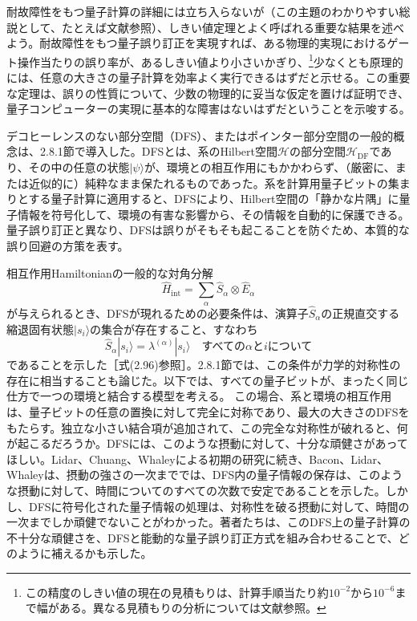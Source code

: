 \hypertarget{srcpage:321}{}\label{srcpage:321}
耐故障性をもつ量子計算の詳細には立ち入らないが（この主題のわかりやすい総説として、たとえば文献\cite{ref056,ref367}参照）、しきい値定理とよく呼ばれる重要な結果\cite{ref360,ref368,ref369,ref370,ref371}を述べよう。耐故障性をもつ量子誤り訂正を実現すれば、ある物理的実現におけるゲート操作当たりの誤り率が、あるしきい値より小さいかぎり、\footnote{この精度のしきい値の現在の見積もりは、計算手順当たり約$10^{-2}$から$10^{-6}$まで幅がある。異なる見積もりの分析については文献\cite{ref372}参照。}少なくとも原理的には、任意の大きさの量子計算を効率よく実行できるはずだと示せる。この重要な定理は、誤りの性質について、少数の物理的に妥当な仮定を置けば証明でき、量子コンピューターの実現に基本的な障害はないはずだということを示唆する。

デコヒーレンスのない部分空間（DFS）\cite{ref089,ref090,ref091,ref092,ref093,ref094,ref095,ref096,ref097,ref098}、またはポインター部分空間\cite{ref009}の一般的概念は、2.8.1節で導入した。DFSとは、系のHilbert空間$\mathcal H$の部分空間$\mathcal H_{\mathrm{DF}}$であり、その中の任意の状態$|\psi\rangle$が、環境との相互作用にもかかわらず、（厳密に、または近似的に）純粋なまま保たれるものであった。系を計算用量子ビットの集まりとする量子計算に適用すると、DFSにより、Hilbert空間の「静かな片隅」に量子情報を符号化して、環境の有害な影響から、その情報を自動的に保護できる。量子誤り訂正と異なり、DFSは誤りがそもそも起こることを防ぐため、本質的な誤り回避の方策を表す。

相互作用Hamiltonianの一般的な対角分解
\begin{equation}\hat H_{\mathrm{int}}=\sum_\alpha\hat S_\alpha\otimes\hat E_\alpha\tag{7.48}\end{equation}
が与えられるとき、DFSが現れるための必要条件は、演算子$\hat S_\alpha$の正規直交する縮退固有状態$|s_i\rangle$の集合が存在すること、すなわち
\begin{equation}\hat S_\alpha|s_i\rangle=\lambda^{(\alpha)}|s_i\rangle\quad\text{すべての$\alpha$と$i$について}\tag{7.49}\end{equation}
であることを示した［式(2.96)参照］。2.8.1節では、この条件が力学的対称性の存在に相当することも論じた。以下では、すべての量子ビットが、まったく同じ仕方で一つの環境と結合する模型を考える。
\hypertarget{srcpage:322}{}\label{srcpage:322}
この場合、系と環境の相互作用は、量子ビットの任意の置換に対して完全に対称であり、最大の大きさのDFSをもたらす。独立な小さい結合項が追加されて、この完全な対称性が破れると、何が起こるだろうか。DFSには、このような摂動に対して、十分な頑健さがあってほしい。Lidar、Chuang、Whaley\cite{ref090}による初期の研究に続き、Bacon、Lidar、Whaley\cite{ref099}は、摂動の強さの一次まででは、DFS内の量子情報の保存は、このような摂動に対して、時間についてのすべての次数で安定であることを示した。しかし、DFSに符号化された量子情報の処理は、対称性を破る摂動に対して、時間の一次までしか頑健でないことがわかった。著者たちは、このDFS上の量子計算の不十分な頑健さを、DFSと能動的な量子誤り訂正方式を組み合わせることで、どのように補えるかも示した\cite{ref094}。

